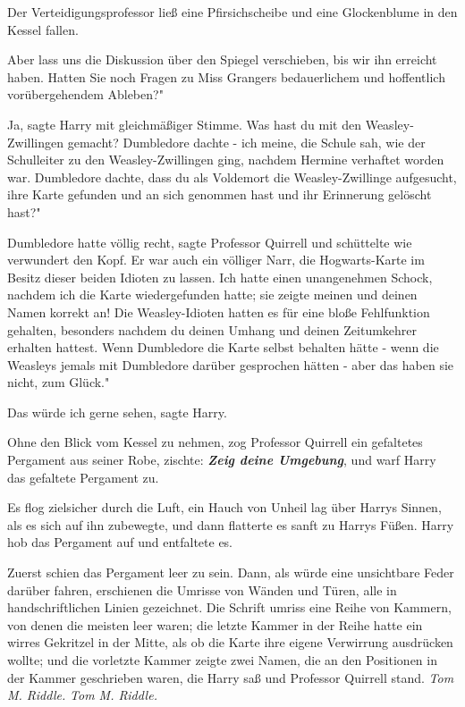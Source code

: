 Der Verteidigungsprofessor ließ eine Pfirsichscheibe und eine Glockenblume in
den Kessel fallen.

\glqq Aber lass uns die Diskussion über den Spiegel verschieben, bis wir ihn
erreicht haben. Hatten Sie noch Fragen zu Miss Grangers bedauerlichem und
hoffentlich vorübergehendem Ableben?"

\glqq Ja\grqq{}, sagte Harry mit gleichmäßiger Stimme. \glqq Was hast du mit den
Weasley-Zwillingen gemacht? Dumbledore dachte - ich meine, die Schule sah, wie
der Schulleiter zu den Weasley-Zwillingen ging, nachdem Hermine verhaftet worden
war. Dumbledore dachte, dass du als Voldemort die Weasley-Zwillinge aufgesucht,
ihre Karte gefunden und an sich genommen hast und ihr Erinnerung gelöscht hast?"

\glqq Dumbledore hatte völlig recht\grqq{}, sagte Professor Quirrell und
schüttelte wie verwundert den Kopf. \glqq Er war auch ein völliger Narr, die
Hogwarts-Karte im Besitz dieser beiden Idioten zu lassen. Ich hatte einen
unangenehmen Schock, nachdem ich die Karte wiedergefunden hatte; sie zeigte
meinen und deinen Namen korrekt an! Die Weasley-Idioten hatten es für eine bloße
Fehlfunktion gehalten, besonders nachdem du deinen Umhang und deinen
Zeitumkehrer erhalten hattest. Wenn Dumbledore die Karte selbst behalten hätte -
wenn die Weasleys jemals mit Dumbledore darüber gesprochen hätten - aber das
haben sie nicht, zum Glück."

\glqq Das würde ich gerne sehen\grqq{}, sagte Harry.

Ohne den Blick vom Kessel zu nehmen, zog Professor Quirrell ein gefaltetes
Pergament aus seiner Robe, zischte: \glqq \textbf{\emph{Zeig deine
Umgebung}}\grqq{}, und warf Harry das gefaltete Pergament zu.

Es flog zielsicher durch die Luft, ein Hauch von Unheil lag über Harrys Sinnen,
als es sich auf ihn zubewegte, und dann flatterte es sanft zu Harrys Füßen.
Harry hob das Pergament auf und entfaltete es.

Zuerst schien das Pergament leer zu sein. Dann, als würde eine unsichtbare Feder
darüber fahren, erschienen die Umrisse von Wänden und Türen, alle in
handschriftlichen Linien gezeichnet. Die Schrift umriss eine Reihe von Kammern,
von denen die meisten leer waren; die letzte Kammer in der Reihe hatte ein
wirres Gekritzel in der Mitte, als ob die Karte ihre eigene Verwirrung
ausdrücken wollte; und die vorletzte Kammer zeigte zwei Namen, die an den
Positionen in der Kammer geschrieben waren, die Harry saß und Professor Quirrell
stand. \emph{ Tom M. Riddle. }
\emph{Tom M. Riddle. }

